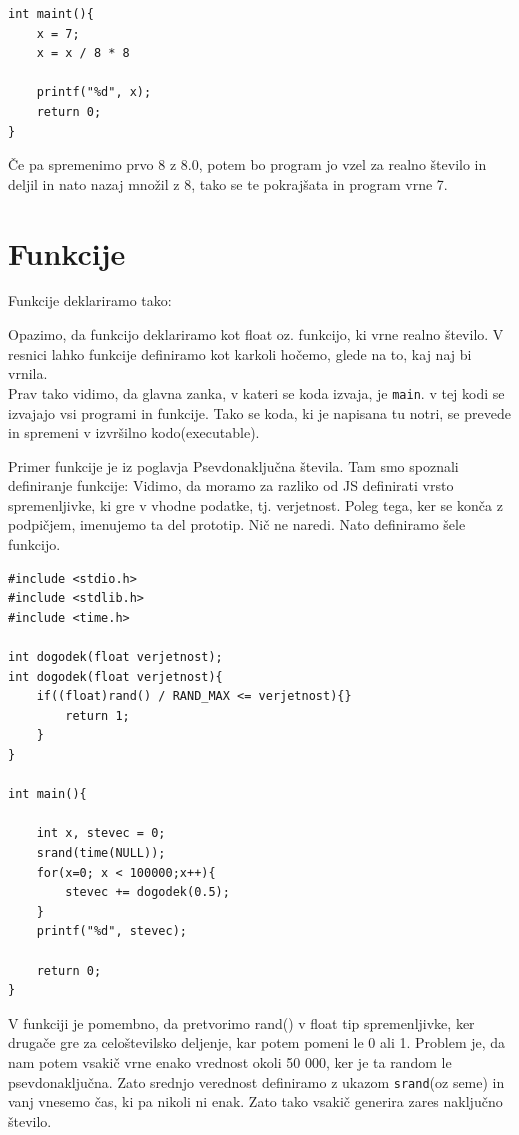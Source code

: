 \documentclass[a4paper, 12pt]{article}
\begin{document}
\begin{lstlisting}
int maint(){	
	x = 7;
	x = x / 8 * 8
	
	printf("%d", x);
	return 0;
}
\end{lstlisting}
Če pa spremenimo prvo 8 z 8.0, potem bo program jo vzel za realno število in deljil in nato nazaj množil z 8, tako se te pokrajšata in program vrne 7.
\section{Funkcije}

Funkcije deklariramo tako:\

{\centering{}\par}

Opazimo, da funkcijo deklariramo kot float oz. funkcijo, ki vrne realno število. V resnici lahko funkcije definiramo kot karkoli hočemo, glede na to, kaj naj bi vrnila.\\
Prav tako vidimo, da glavna zanka, v kateri se koda izvaja, je \texttt{main}. v tej kodi se izvajajo vsi programi in funkcije. Tako se koda, ki je napisana tu notri, se prevede in spremeni v izvršilno kodo(executable).\

Primer funkcije je iz poglavja Psevdonaključna števila. Tam smo spoznali definiranje funkcije:
 Vidimo, da moramo za razliko od JS definirati vrsto spremenljivke, ki gre v vhodne podatke, tj. verjetnost. Poleg tega, ker se konča z podpičjem, imenujemo ta del prototip. Nič ne naredi. Nato definiramo šele funkcijo.

\begin{lstlisting}
#include <stdio.h>
#include <stdlib.h>
#include <time.h>

int dogodek(float verjetnost);
int dogodek(float verjetnost){
	if((float)rand() / RAND_MAX <= verjetnost){}
		return 1;
	}
}

int main(){

	int x, stevec = 0;
	srand(time(NULL));
	for(x=0; x < 100000;x++){
		stevec += dogodek(0.5);
	}
	printf("%d", stevec);

	return 0;
}
\end{lstlisting}

V funkciji je pomembno, da pretvorimo rand() v float tip spremenljivke, ker drugače gre za celoštevilsko deljenje, kar potem pomeni le 0 ali 1. Problem je, da nam potem vsakič vrne enako vrednost okoli 50 000, ker je ta random le psevdonaključna. Zato srednjo verednost definiramo z ukazom \texttt{srand}(oz seme) in vanj vnesemo čas, ki pa nikoli ni enak. Zato tako vsakič generira zares naključno število.\
\end{document}
